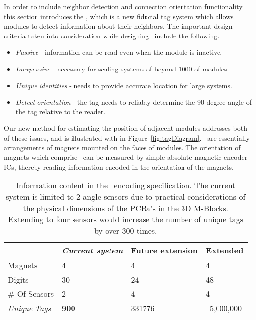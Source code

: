 In order to include neighbor detection and connection orientation functionality this section introduces the \TagNamePlural, which is a new fiducial tag system which allows modules to detect information about their neighbors. The important design criteria taken into consideration while designing \TagNamePlural~include the following:
\begin{itemize}
	\item \emph{Passive} - information can be read even when the module is inactive.
	\item \emph{Inexpensive} - necessary for scaling systems of beyond 1000 of modules.
	\item \emph{Unique identities} - needs to provide accurate location for large systems.
	\item \emph{Detect orientation} - the tag needs to reliably determine the 90-degree angle of the tag relative to the reader.
\end{itemize} 

Our new method for estimating the position of adjacent modules addresses both of these issues, and is illustrated with in Figure~\ref{fig:tagDiagram}. \TagNamePlural~are essentially arrangements of magnets mounted on the faces of modules.  The orientation of magnets which comprise \tagNamePlural~can be measured by simple absolute magnetic encoder ICs, thereby reading information encoded in the orientation of the magnets.

\begin{table}[b]
	\caption{Information content in the \TagNamePlural~encoding specification. The current system is limited to 2 angle sensors due to practical considerations of the physical dimensions of the  PCBa's in the 3D M-Blocks. Extending to four sensors would increase the number of unique tags by over 300 times.}
	
	\begin{tabular}{ p{1.6cm}  p{1.8cm}  p{1.9cm}  p{1.5cm}}
		\hline
								& \textit{Current system} & Future extension & Extended \\
		\hline
				\addlinespace[1ex]
		Magnets  				& 4 			 &	4				&	4	\\
		Digits 					& 30 			 &	24				&	48	\\
		\# Of Sensors 			& 2 			 &	4				&	4	\\
		\textit{Unique Tags} 	& \textbf{900} 	 & 331776			& 	~5,000,000\\
		
	\end{tabular}
	
	\label{tab:hardwareOverview}
\end{table}


